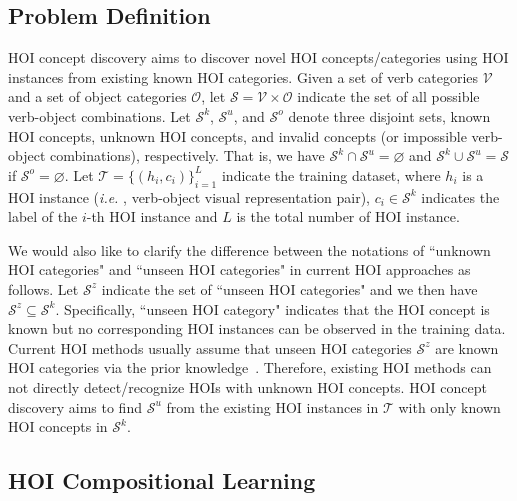 \documentclass[runningheads]{llncs}
\newcommand{\ie}{\textit{i.e. }}
\begin{document}
\subsection{Problem Definition}

HOI concept discovery aims to discover novel HOI concepts/categories using HOI instances from existing known HOI categories. Given a set of verb categories $\mathcal{V}$ and a set of object categories $\mathcal{O}$, let $\mathcal{S}=\mathcal{V}\times \mathcal{O}$ indicate the set of all possible verb-object combinations. Let $\mathcal{S}^{k}$, $\mathcal{S}^{u}$, and $\mathcal{S}^{o}$ denote three disjoint sets, known HOI concepts, unknown HOI concepts, and invalid concepts (or impossible verb-object combinations), respectively. That is, we have $\mathcal{S}^{k} \cap \mathcal{S}^{u}=\varnothing$ and $\mathcal{S}^k \cup \mathcal{S}^u = \mathcal{S}$ if $\mathcal{S}^o=\varnothing$. Let $\mathcal{T}=\{(h_i, c_i)\}_{i=1}^{L}$ indicate the training dataset, where $h_i$ is a HOI instance (\ie, verb-object visual representation pair), $c_i \in \mathcal{S}^k$ indicates the label of the $i$-th HOI instance and $L$ is the total number of HOI instance.

We would also like to clarify the difference between the notations of ``unknown HOI categories" and ``unseen HOI categories" in current HOI approaches as follows.
Let $\mathcal{S}^{z}$ indicate the set of ``unseen HOI categories" and we then have $\mathcal{S}^{z} \subseteq \mathcal{S}^{k}$.
Specifically, ``unseen HOI category" indicates that the HOI concept is known but no corresponding HOI instances can be observed in the training data. Current HOI methods usually assume that unseen HOI categories $\mathcal{S}^{z}$ are known HOI categories via the prior knowledge~\cite{shen2018scaling,kato2018compositional,preye2019detecting,bansal2020detecting,hou2020visual}. Therefore, existing HOI methods can not directly detect/recognize HOIs with unknown HOI concepts. HOI concept discovery aims to find $\mathcal{S}^u$ from the existing HOI instances in $\mathcal{T}$ with only known HOI concepts in $\mathcal{S}^{k}$.


\subsection{HOI Compositional Learning}
\end{document}
